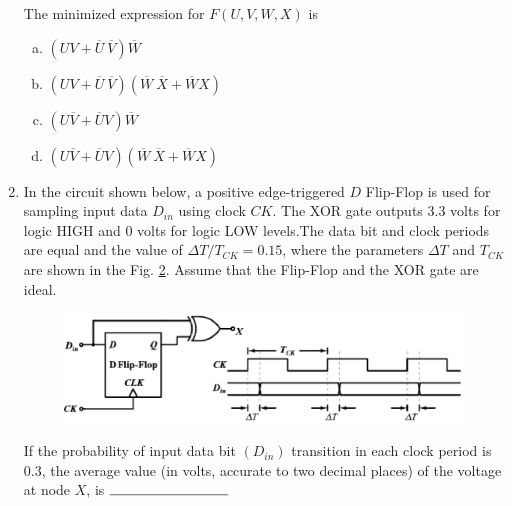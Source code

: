 \documentclass[journal,12pt,twocolumn]{IEEEtran}
\begin{document}
\begin{enumerate}
\begin{figure}
\caption{}

\label{fig:59}

\end{figure} 



The minimized expression for $F(U,V,W,X)$ is 

\begin{enumerate}[(a)]

\item $ (UV+\overline{U} \ \overline{V})\overline{W} $

\item $ (UV+\overline{U} \ \overline{V})(\overline{W} \ \overline{X}+\overline{W}X) $

\item $ (U\overline{V}+\overline{U}V)\overline{W} $

\item $ (U\overline{V}+\overline{U}V)(\overline{W} \ \overline{X}+\overline{W}X) $

\end{enumerate}

\item In the circuit shown below, a positive edge-triggered $D$ Flip-Flop is used for sampling input data $ D_{in} $ using clock $CK$. The XOR gate outputs $3.3$ volts for logic HIGH and $0$ volts for logic LOW levels.The data bit and clock periods are equal and the value of $ \Delta T / T_{CK}=0.15$, where the parameters $ \Delta T $ and $T_{CK}$ are shown in the Fig. \ref{fig:60}. Assume that the Flip-Flop and the XOR gate are ideal.

\begin{figure}

\centering

\includegraphics[width=\columnwidth]{./figs/68.eps}

\caption{}

\label{fig:60}

\end{figure} 




If the probability of input data bit $ (D_{in}) $ transition in each clock period is $0.3$, the average value (in volts, accurate to two decimal places) of the voltage at node $X$, is $ \rule{3cm}{0.15mm}$ 












\end{enumerate}
\end{document}
